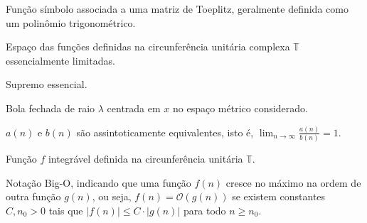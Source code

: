 \begin{description}[leftmargin=!, labelwidth=\widthof{\texttt{Função $f : X \to Y$}}]
  \item[$a(x)$] Função símbolo associada a uma matriz de Toeplitz, geralmente definida como um polinômio trigonométrico.

  \item[$L^\infty(\mathbb{T})$] Espaço das funções definidas na circunferência unitária complexa $\mathbb{T}$ essencialmente limitadas.

  \item[$\esssup$] Supremo essencial.

  \item[$\overline{B}_{\lambda}(x)$] Bola fechada de raio $\lambda$ centrada em $x$ no espaço métrico considerado.

  \item[$a(n) \sim b(n)$] $a(n)$ e $b(n)$ são assintoticamente equivalentes, isto é, $\lim_{n \to \infty} \frac{a(n)}{b(n)} = 1$.

  \item[$f \in L^1(\mathbb{T})$] Função $f$ integrável definida na circunferência unitária $\mathbb{T}$.

  \item[$\mathcal{O}(\cdot)$] Notação Big-O, indicando que uma função $f(n)$ cresce no máximo na ordem de outra função $g(n)$, ou seja, $f(n) = \mathcal{O}(g(n))$ se existem constantes $C, n_0 > 0$ tais que $|f(n)| \leq C \cdot |g(n)|$ para todo $n \geq n_0$.
\end{description}
